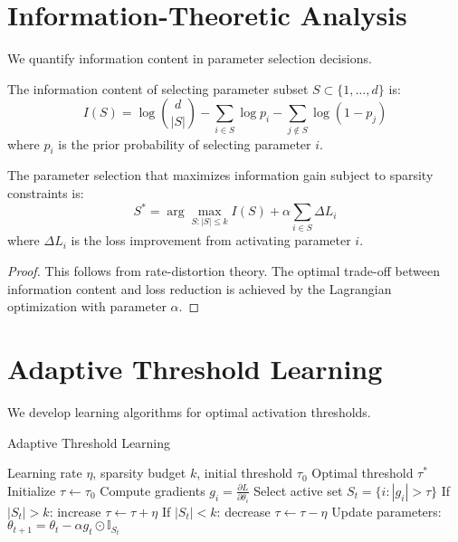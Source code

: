\section{Information-Theoretic Analysis}

We quantify information content in parameter selection decisions.

\begin{definition}
\label{def:selection_information}
The information content of selecting parameter subset $S \subset \{1,\ldots,d\}$ is:
$$I(S) = \log \binom{d}{|S|} - \sum_{i \in S} \log p_i - \sum_{j \notin S} \log(1-p_j)$$
where $p_i$ is the prior probability of selecting parameter $i$.
\end{definition}

\begin{theorem}
\label{thm:information_selection}
The parameter selection that maximizes information gain subject to sparsity constraints is:
$$S^* = \arg\max_{S: |S| \leq k} I(S) + \alpha \sum_{i \in S} \Delta L_i$$
where $\Delta L_i$ is the loss improvement from activating parameter $i$.
\end{theorem}

\begin{proof}
This follows from rate-distortion theory. The optimal trade-off between information content and loss reduction is achieved by the Lagrangian optimization with parameter $\alpha$.
\end{proof}

\section{Adaptive Threshold Learning}

We develop learning algorithms for optimal activation thresholds.

\begin{algorithm}
\caption{Adaptive Threshold Learning}
\begin{algorithmic}[1]
\Require Learning rate $\eta$, sparsity budget $k$, initial threshold $\tau_0$
\Ensure Optimal threshold $\tau^*$
\State Initialize $\tau \leftarrow \tau_0$
    \State Compute gradients $g_i = \frac{\partial L}{\partial \theta_i}$
    \State Select active set $S_t = \{i : |g_i| > \tau\}$
    \State If $|S_t| > k$: increase $\tau \leftarrow \tau + \eta$
    \State If $|S_t| < k$: decrease $\tau \leftarrow \tau - \eta$
    \State Update parameters: $\theta_{t+1} = \theta_t - \alpha g_t \odot \mathbb{I}_{S_t}$
\EndFor
\end{algorithmic}
\end{algorithm}

